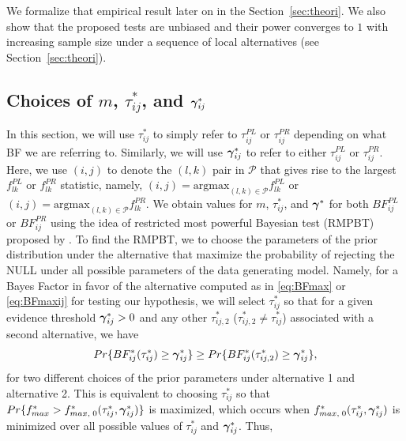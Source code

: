 \documentclass[times,sort&compress,3p]{elsarticle}
\theoremstyle{plain}%
\theoremstyle{definition}
\def\boldpsi{{\mbox{\boldmath $\psi$}}}
\newcommand{\ugamma}            {\mbox{\boldmath$\gamma$}}
\begin{document}
We formalize that empirical result later on in the Section~\ref{sec:theori}. %
We also show that the proposed tests are unbiased and their power converges to $1$ with increasing sample size under a sequence of local alternatives (see Section~\ref{sec:theori}).  

\subsection{Choices of $m$, $\tau^{*}_{ij}$, and $\ugamma^{*}_{ij}$} \label{sec:testmtaugam}
In this section, we will use $\tau^{*}_{ij}$ to simply refer to $\tau^{PL}_{ij}$ or $\tau^{PR}_{ij}$ depending on what BF we are referring to. Similarly, we will use $\ugamma^{*}_{ij}$ to refer to either $\tau^{PL}_{ij}$ or $\tau^{PR}_{ij}$. 
Here, we use $(i, j)$ to denote the $(l, k)$ pair in $\mathcal{P}$ that gives rise to the largest $f_{lk}^{PL}$ or $f_{lk}^{PR}$ statistic, namely, $(i, j) = \mathrm{argmax}_{(l, k)\in\mathcal{P}}f_{lk}^{PL}$ or $(i, j) = \mathrm{argmax}_{(l, k)\in\mathcal{P}}f_{lk}^{PR}$. 
We obtain values for $m$, $\tau^{*}_{ij}$, and $\ugamma^{*}$ for both $BF^{PL}_{ij}$ or $BF^{PR}_{ij}$ using the idea of restricted most powerful Bayesian test (RMPBT) proposed by \cite{GoddardJohnson,Goddard}. To find the RMPBT, we to choose the parameters of the prior distribution under the alternative that maximize the probability of rejecting the NULL under all possible parameters of the data generating model. Namely, for a Bayes Factor in favor of the alternative computed as in \eqref{eq:BFmax} or \eqref{eq:BFmaxij} for testing our hypothesis, we will select $\tau^{*}_{ij}$ so that for a given evidence threshold $\ugamma^{*}_{ij} > 0$ and any other $\tau^{*}_{ij,2}$ ($\tau^{*}_{ij,2} \neq \tau^{*}_{ij}$) associated with a second alternative, we have
$$Pr\{BF^{*}_{ij}(\tau^{*}_{ij}) \geq  \ugamma^{*}_{ij}\} \geq Pr\{BF^{*}_{ij}(\tau^{*}_{ij,2}) \geq \ugamma^{*}_{ij} \},$$
for two different choices of the prior parameters under alternative 1 and alternative 2.
This is equivalent to choosing $\tau^{*}_{ij}$ so that $Pr\{f^{*}_{max} > f^{*}_{max,\;0}(\tau^{*}_{ij},\ugamma^{*}_{ij})\}$ is maximized, which occurs when $f^{*}_{max,\;0}(\tau^{*}_{ij},\ugamma^{*}_{ij})$ is minimized over all possible values of $\tau^{*}_{ij}$ and $\ugamma^{*}_{ij}$. Thus, 
\end{document}
